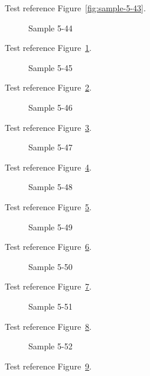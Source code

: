 Test reference Figure~\ref{fig:sample-5-43}.

\begin{figure}[tbhp]
\caption{Sample 5-44}
\label{fig:sample-5-44}
\end{figure}

Test reference Figure~\ref{fig:sample-5-44}.

\begin{figure}[tbhp]
\caption{Sample 5-45}
\label{fig:sample-5-45}
\end{figure}

Test reference Figure~\ref{fig:sample-5-45}.

\begin{figure}[tbhp]
\caption{Sample 5-46}
\label{fig:sample-5-46}
\end{figure}

Test reference Figure~\ref{fig:sample-5-46}.

\begin{figure}[tbhp]
\caption{Sample 5-47}
\label{fig:sample-5-47}
\end{figure}

Test reference Figure~\ref{fig:sample-5-47}.

\begin{figure}[tbhp]
\caption{Sample 5-48}
\label{fig:sample-5-48}
\end{figure}

Test reference Figure~\ref{fig:sample-5-48}.

\begin{figure}[tbhp]
\caption{Sample 5-49}
\label{fig:sample-5-49}
\end{figure}

Test reference Figure~\ref{fig:sample-5-49}.

\begin{figure}[tbhp]
\caption{Sample 5-50}
\label{fig:sample-5-50}
\end{figure}

Test reference Figure~\ref{fig:sample-5-50}.

\begin{figure}[tbhp]
\caption{Sample 5-51}
\label{fig:sample-5-51}
\end{figure}

Test reference Figure~\ref{fig:sample-5-51}.

\begin{figure}[tbhp]
\caption{Sample 5-52}
\label{fig:sample-5-52}
\end{figure}

Test reference Figure~\ref{fig:sample-5-52}.


